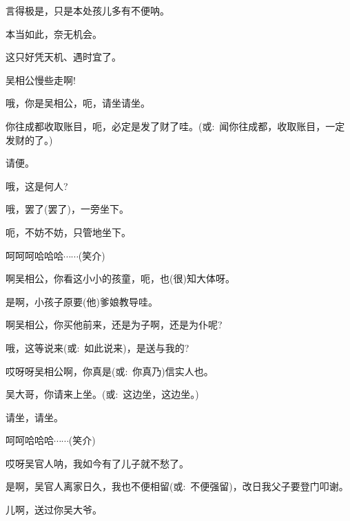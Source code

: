 {{{言得极是，只是本处孩儿多有不便呐。}

{本当如此，奈无机会。}

{这只好凭天机、遇时宜了。}

{吴相公慢些走啊!}


{\vspace{5pt}}


{哦，你是吴相公，呃，请坐请坐。}

{你往成都收取账目，呃，必定是发了财了哇。({\akai 或}:~}闻你往成都，收取账目，一定发财的了。{)}

{请便。}

{哦，这是何人?}

{哦，罢了(罢了)，一旁坐下。}

{呃，不妨不妨，只管地坐下。}

{呵呵呵哈哈哈$\cdots{}\cdots{}$({\hwfs 笑介})}

{啊吴相公，你看这小小的孩童，呃，也(很)知大体呀。}

{是啊，小孩子原要(他)爹娘教导哇。}

{啊吴相公，你买他前来，还是为子啊，还是为仆呢?}

{哦，这等说来({\akai 或}:~}如此说来){，是送与我的?}

{哎呀呀吴相公啊，你真是({\akai 或}:~}你真乃){信实人也。}


{吴大哥，你请来上坐。({\akai 或}:~这边坐，这边坐。)}

{请坐，请坐。}


{呵呵哈哈哈$\cdots{}\cdots{}$({\hwfs 笑介})}

{哎呀吴官人呐，我如今有了儿子就不愁了。}

{是啊，吴官人离家日久，我也不便相留({\akai 或}:~不便强留)，改日我父子要登门叩谢。}

{儿啊，送过你吴大爷。}

}}
